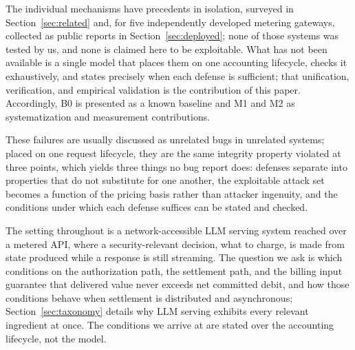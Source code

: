 \documentclass[manuscript,review]{acmart}
\begin{document}
The individual mechanisms have precedents in isolation, surveyed in
Section~\ref{sec:related} and, for five independently developed metering gateways,
collected as public reports in Section~\ref{sec:deployed}; none of those systems was
tested by us, and none is claimed here to be exploitable. What has not been available is a
single model that places them on one accounting lifecycle, checks it exhaustively, and
states precisely when each defense is sufficient; that unification, verification, and
empirical validation is the contribution of this paper. Accordingly, B0 is presented as a
known baseline and M1 and M2 as systematization and measurement contributions.

These failures are usually discussed as unrelated bugs in unrelated systems; placed on one
request lifecycle, they are the same integrity property violated at three points, which
yields three things no bug report does: defenses separate into properties that do not
substitute for one another, the exploitable attack set becomes a function of the pricing
basis rather than attacker ingenuity, and the conditions under which each defense
suffices can be stated and checked.

The setting throughout is a network-accessible LLM serving system reached over a metered
API, where a security-relevant decision, what to charge, is made from state produced
while a response is still streaming. The question we ask is which conditions on the
authorization path, the settlement path, and the billing input guarantee that delivered
value never exceeds net committed debit, and how those conditions behave when settlement
is distributed and asynchronous; Section~\ref{sec:taxonomy} details why LLM serving
exhibits every relevant ingredient at once. The conditions we arrive at are stated over
the accounting lifecycle, not the model.
\end{document}
